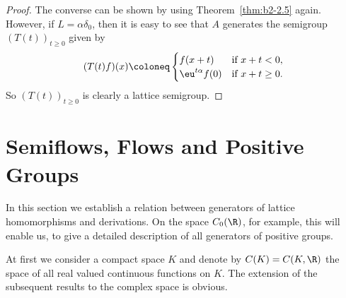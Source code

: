 \begin{proof}
The converse can be shown by using Theorem~\ref{thm:b2-2.5} again.
However, if\/ $L = \alpha\delta_{0}$, then it is easy to see that $A$ generates the semigroup $(T(t))_{t \geq 0}$ given by
\begin{equation*}
(T(t)f)(x) \coloneq \begin{cases}
    f(x+t) & \text{if } x+t < 0  ,\\
    \eu^{t\alpha}f(0) & \text{if } x+t \geq 0  .
\end{cases}
\end{equation*}
So $(T(t))_{t \geq 0}$ is clearly a lattice semigroup.
\end{proof}
\section{Semiflows, Flows and Positive Groups}\label{sec:b2-3}
In this section we establish a relation between generators of lattice homomorphisms and derivations.
On the space $C_{0}(\R)$, for example, this will enable us, to give a detailed description of all generators of positive groups.

At first we consider a compact space $K$ and denote by $C(K) = C(K,\R)$ the space of all real valued continuous functions on $K$.
The extension of the subsequent results to the complex space is obvious.

